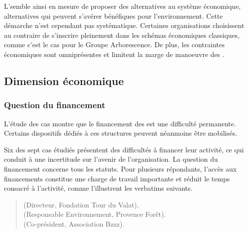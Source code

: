         L'\ess semble ainsi en mesure de proposer des alternatives au système économique, alternatives qui peuvent s'avérer bénéfiques pour l'environnement. Cette démarche n'est cependant pas systématique. Certaines organisations choisissent au contraire de s'inscrire pleinement dans les schémas économiques classiques, comme c'est le cas pour le Groupe Arborescence. De plus, les contraintes économiques sont omniprésentes et limitent la marge de manoeuvre des \oess.

    \subsection{Dimension économique}
        \subsubsection{Question du financement}
        \label{paragraphe:det_fin}

        L'étude des cas montre que le financement des \oess est une difficulté permanente. Certains dispositifs dédiés à ces structures peuvent néanmoins être mobilisés.

        Six des sept cas étudiés présentent des difficultés à financer leur activité, ce qui conduit à une incertitude sur l'avenir de l'organisation. La question du financement concerne tous les statuts. Pour plusieurs répondants, l'accès aux financements constitue une charge de travail importante et réduit le temps consacré à l'activité, comme l'illustrent les verbatims suivants.

        \begin{quotation}
             (Directeur, Fondation Tour du Valat). \\
             (Responsable Environnement, Provence Forêt). \\
             (Co-président, Association Bzzz). \\
        \end{quotation}

